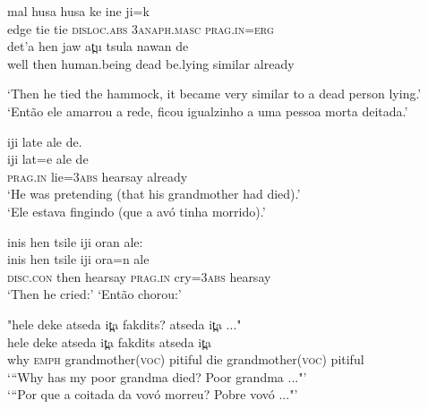 \documentclass[output=paper,
modfonts,nonflat
]{langsci/langscibook}
\begin{document}
\gll mal{\footnotemark} husa husa ke{\footnotemark} ine ji=k\\
edge   tie       tie       \textsc{disloc.abs} \textsc{3anaph.masc}  \textsc{prag.in}=\textsc{erg}\\


	
\gll det'a   hen    jaw  at̪u  tsula  nawan  de\\
well  then  human.being  dead  be.lying   similar  already\\
\addtocounter{footnote}{-1}
\newpage 
\glt ‘Then he tied the hammock, it became very similar to a dead person lying.'
‘Então ele amarrou a rede, ficou igualzinho a uma pessoa morta deitada.’
\z

  
\ea iji late ale de.\\[.3em]
\gll iji          lat=e         ale           de\\
\textsc{prag.in}  lie=\textsc{3abs}   hearsay   already\\
\glt ‘He was pretending (that his grandmother had died).'\\
‘Ele estava fingindo (que a avó tinha morrido).’
\z

\ea inis hen tsile iji oran ale:\\[.3em]
\gll inis          hen   tsile         iji          ora=n        ale\\
\textsc{disc.con}  then  hearsay  \textsc{prag.in}  cry=\textsc{3abs}  hearsay\\
\glt ‘Then he cried:'
\glt ‘Então chorou:’
\z

\ea "hele deke atseda it̪a fakdits? atseda it̪a ..."\\[.3em]
\gll hele  deke    atseda                      it̪a       fakdits   atseda                it̪a\\
why  \textsc{emph}   grandmother(\textsc{voc})   pitiful   die         grandmother(\textsc{voc})   pitiful\\   
\glt ‘“Why has my poor grandma died? Poor grandma ..."'\\
‘“Por que a coitada da vovó morreu? Pobre vovó ..."'{\footnotemark}
\z
\end{document}
